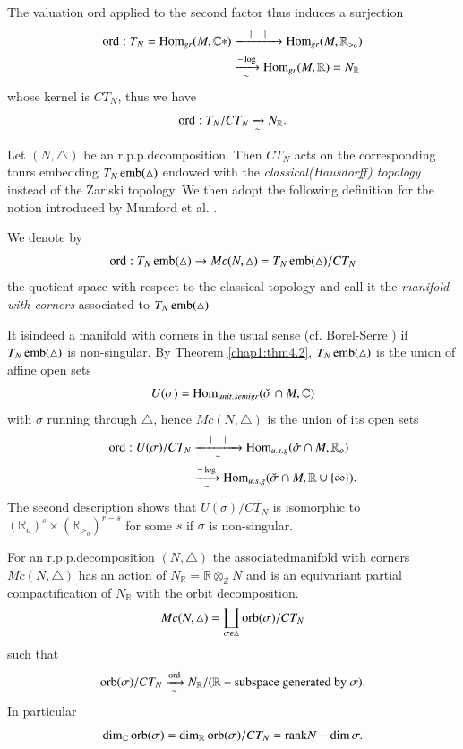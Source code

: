The valuation ord applied to the second factor thus induces a
surjection 
\begin{align*}
\operatorname{ord}:T_N = \operatorname{Hom}_{gr}(M,\mathbb{C}*)&\xrightarrow{ \quad | \quad | \quad
}\operatorname{Hom}_{gr}(M, \mathbb{R}_{>_0})\\
&\xrightarrow[\sim]{-\log}
\operatorname{Hom}_{gr}(M, \mathbb{R})=N_{\mathbb{R}} 
\end{align*}
whose kernel is $CT_N$, thus we have 
$$
 \operatorname{ord}:T_N/CT_N\xrightarrow[\sim]{~}  N_{\mathbb{R}}. 
$$

Let $(N,\triangle)$ be an r.p.p.decomposition. Then $CT_N$ acts on the
corresponding tours embedding $T_N \operatorname{emb}(\triangle)$ endowed with the
\textit{classical\break (Hausdorff) topology} instead of the Zariski
topology. We then adopt the following definition for the notion
introduced by Mumford et al. \cite[Chap. 1,
  \S. 1]{keySC}.  

\begin{defi*}
We denote by
$$
\operatorname{ord}:T_N \operatorname{emb}(\triangle)\to Mc(N,\triangle)=T_N \operatorname{emb}(\triangle)/CT_N 
$$
the quotient space with respect to the classical topology and call it
the \textit{manifold with corners} associated to $T_N \operatorname{emb}(\triangle)$ 
\end{defi*}

It is\pageoriginale indeed a manifold with corners in the usual sense
(cf. Borel-Serre \cite{keyBS}) if  $T_N \operatorname{emb}(\triangle)$ is non-singular. By
Theorem \ref{chap1:thm4.2}, $T_N \operatorname{emb}(\triangle)$ is the union of
affine open sets   
$$
U(\sigma)=\operatorname{Hom}_{unit.semigr}(\check{\sigma}\cap M,\mathbb{C})
$$
with $\sigma$ running through $\triangle$, hence $Mc(N,\triangle)$ is the
union of its open sets 
\begin{align*}
\operatorname{ord}: U(\sigma)/CT_N &\xrightarrow[\sim]{\quad | \quad | \quad
}\operatorname{Hom}_{u.s.g}(\check{\sigma}\cap 
M, \mathbb{R}_o)\\
&\xrightarrow[\sim]{-\log}\operatorname{Hom}_{u.s.g}(\check{\sigma}\cap
M, \mathbb{R} \cup \{\infty\}). 
\end{align*}
The second description shows that $U(\sigma)/CT_N$ is isomorphic to
$( \mathbb{R}_o)^s \times(\mathbb{R}_{>_o})^{r-s}$ for some $s$ if
$\sigma$ is non-singular.  

\begin{prop}\label{chap2:prop10.1}
For an r.p.p.decomposition $(N,\triangle)$ the associated\break manifold with
corners $Mc(N,\triangle)$ has an action of $N_{\mathbb{R}}=
\mathbb{R}\otimes_{\mathbb{Z}}N$ 
and  is an equivariant partial compactification of $N_{\mathbb{R}}$
with the orbit decomposition. 
$$
Mc(N,\triangle)=\coprod_{\sigma \epsilon \triangle} \operatorname{orb} (\sigma)/CT_N 
$$
such that
$$
\operatorname{orb}
(\sigma)/CT_N\xrightarrow[\sim]{\operatorname{ord}}N_{\mathbb{R}}/(\mathbb{R}-\text{subspace
  generated by  }\sigma). 
$$
In particular
$$
\dim_{\mathbb{C}} \operatorname{orb}(\sigma)=\dim_{\mathbb{R}} \operatorname{orb} (\sigma)/CT_N=
    {\rm rank} N-\dim\sigma .
$$
\end{prop}

